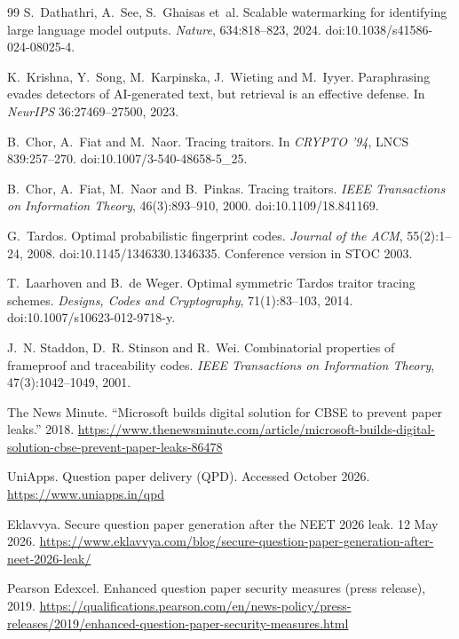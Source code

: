 \documentclass[10pt,a4paper]{article}
\theoremstyle{remark}
\begin{document}
\begin{thebibliography}{99}
 S.~Dathathri, A.~See, S.~Ghaisas et~al. Scalable watermarking for identifying large language model outputs. \emph{Nature}, 634:818--823, 2024. doi:10.1038/s41586-024-08025-4.

 K.~Krishna, Y.~Song, M.~Karpinska, J.~Wieting and M.~Iyyer. Paraphrasing evades detectors of AI-generated text, but retrieval is an effective defense. In \emph{NeurIPS} 36:27469--27500, 2023.

 B.~Chor, A.~Fiat and M.~Naor. Tracing traitors. In \emph{CRYPTO '94}, LNCS 839:257--270. doi:10.1007/3-540-48658-5\_25.

 B.~Chor, A.~Fiat, M.~Naor and B.~Pinkas. Tracing traitors. \emph{IEEE Transactions on Information Theory}, 46(3):893--910, 2000. doi:10.1109/18.841169.

 G.~Tardos. Optimal probabilistic fingerprint codes. \emph{Journal of the ACM}, 55(2):1--24, 2008. doi:10.1145/1346330.1346335. Conference version in STOC 2003.

 T.~Laarhoven and B.~de Weger. Optimal symmetric Tardos traitor tracing schemes. \emph{Designs, Codes and Cryptography}, 71(1):83--103, 2014. doi:10.1007/s10623-012-9718-y.

 J.~N. Staddon, D.~R. Stinson and R.~Wei. Combinatorial properties of frameproof and traceability codes. \emph{IEEE Transactions on Information Theory}, 47(3):1042--1049, 2001.

 The News Minute. \enquote{Microsoft builds digital solution for CBSE to prevent paper leaks.} 2018. \url{https://www.thenewsminute.com/article/microsoft-builds-digital-solution-cbse-prevent-paper-leaks-86478}

 UniApps. Question paper delivery (QPD). Accessed October 2026. \url{https://www.uniapps.in/qpd}

 Eklavvya. Secure question paper generation after the NEET 2026 leak. 12 May 2026. \url{https://www.eklavvya.com/blog/secure-question-paper-generation-after-neet-2026-leak/}

 Pearson Edexcel. Enhanced question paper security measures (press release), 2019. \url{https://qualifications.pearson.com/en/news-policy/press-releases/2019/enhanced-question-paper-security-measures.html}


\end{thebibliography}
\end{document}
